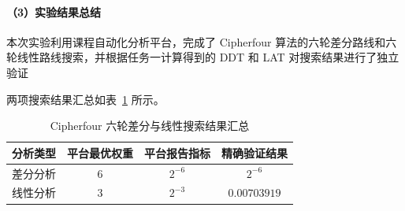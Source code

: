 \paragraph{（3）实验结果总结}

本次实验利用课程自动化分析平台，完成了 Cipherfour 算法的六轮差分路线和六轮线性路线搜索，并根据任务一计算得到的 DDT 和 LAT 对搜索结果进行了独立验证

两项搜索结果汇总如表~\ref{tab:cipherfour-summary} 所示。

\begin{table}[H]
\centering
\caption{Cipherfour 六轮差分与线性搜索结果汇总}
\label{tab:cipherfour-summary}
\begin{tabular}{c|c|c|c}
\hline
分析类型 & 平台最优权重 & 平台报告指标 & 精确验证结果 \\
\hline
差分分析 & $6$ & $2^{-6}$ & $2^{-6}$ \\
线性分析 & $3$ & $2^{-3}$ & $0.00703919$ \\
\hline
\end{tabular}
\end{table}